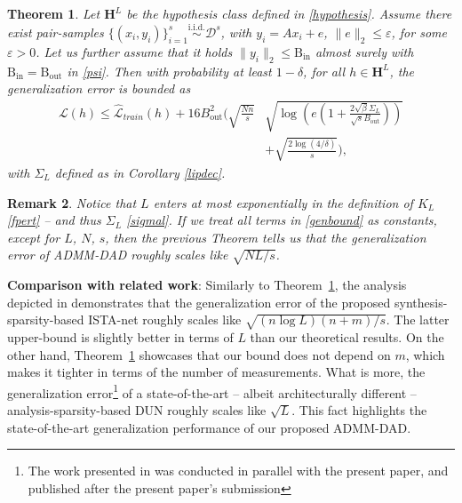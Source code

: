 \documentclass[preprint,12pt]{elsarticle}
\newtheorem{theorem}{Theorem}[section]
\newtheorem{remark}[theorem]{Remark}
\begin{document}
\begin{theorem}\label{gengentheorem}
Let $\mathbf{H}^L$ be the hypothesis class defined in \eqref{hypothesis}. Assume there exist pair-samples $\{(x_i,y_i)\}_{i=1}^s\overset{\text{i.i.d.}}{\sim}\mathcal{D}^s$, with $y_i=Ax_i+e$, $\|e\|_2\leq\varepsilon$, for some $\varepsilon>0$. Let us further assume that it holds $\|y_i\|_2\leq\mathrm{B_{in}}$ almost surely with $\mathrm{B_{in}}=\mathrm{B_{out}}$ in \eqref{psi}. Then with probability at least $1-\delta$, for all $h\in\mathbf{H}^L$, the generalization error is bounded as
\begin{equation}
    \begin{split}\label{genbound}
    \mathcal{L}(h)\leq\mathcal{\hat{L}}_{train}(h)+16B^2_{\mathrm{out}}\Bigg(\sqrt{\frac{Nn}{s}}&\sqrt{\log\left(e\left(1+\frac{2\sqrt{\beta }\Sigma_L}{\sqrt{s}B_{\mathrm{out}}}\right)\right)}\\
    &+\sqrt{\frac{2\log(4/\delta)}{s}}\Bigg),
    \end{split}
\end{equation}
with $\Sigma_L$ defined as in Corollary \ref{lipdec}.
\end{theorem}
\begin{remark}
    Notice that $L$ enters at most exponentially in the definition of $K_L$ \eqref{fpert} -- and thus $\Sigma_L$ \eqref{sigmal}. If we treat all terms in \eqref{genbound} as constants, except for $L$, $N$, $s$, then the previous Theorem tells us that the generalization error of ADMM-DAD roughly scales like $\sqrt{NL/s}$.
\end{remark}
\noindent\textbf{Comparison with related work}: Similarly to Theorem~\ref{gengentheorem}, the analysis depicted in \cite[Theorem 2]{istagen} demonstrates that the generalization error of the proposed synthesis-sparsity-based ISTA-net roughly scales like $\sqrt{(n\log L)(n+m)/s}$. The latter upper-bound is slightly better in terms of $L$ than our theoretical results. On the other hand, Theorem~\ref{gengentheorem} showcases that our bound does not depend on $m$, which makes it tighter in terms of the number of measurements. What is more, the generalization error\footnote{The work presented in \cite{deconet} was conducted in parallel with the present paper, and published after the present paper's submission} of a state-of-the-art -- albeit architecturally different -- analysis-sparsity-based DUN \cite{deconet} roughly scales like $\sqrt{L}$. This fact highlights the state-of-the-art generalization performance of our proposed ADMM-DAD. 
\end{document}
